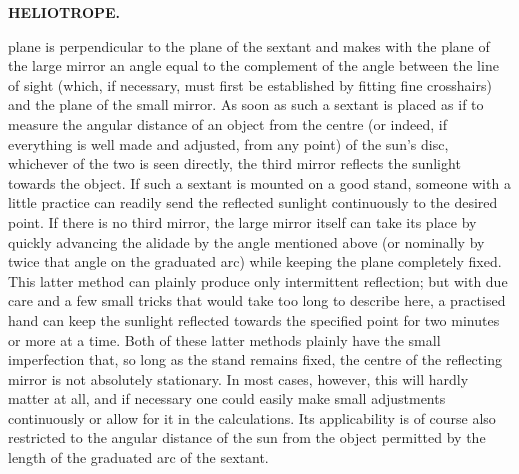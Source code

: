 \par\clearpage
\noindent\null\hfill{\small\textbf{HELIOTROPE.}}\hfill{}\par\medskip
\noindent plane is perpendicular to the plane of the sextant and makes with the plane of the large mirror an angle equal to the complement of the angle between the line of sight (which, if necessary, must first be established by fitting fine crosshairs) and the plane of the small mirror. As soon as such a sextant is placed as if to measure the angular distance of an object from the centre (or indeed, if everything is well made and adjusted, from any point) of the sun's disc, whichever of the two is seen directly, the third mirror reflects the sunlight towards the object. If such a sextant is mounted on a good stand, someone with a little practice can readily send the reflected sunlight continuously to the desired point. If there is no third mirror, the large mirror itself can take its place by quickly advancing the alidade by the angle mentioned above (or nominally by twice that angle on the graduated arc) while keeping the plane completely fixed. This latter method can plainly produce only intermittent reflection; but with due care and a few small tricks that would take too long to describe here, a practised hand can keep the sunlight reflected towards the specified point for two minutes or more at a time. Both of these latter methods plainly have the small imperfection that, so long as the stand remains fixed, the centre of the reflecting mirror is not absolutely stationary. In most cases, however, this will hardly matter at all, and if necessary one could easily make small adjustments continuously or allow for it in the calculations. Its applicability is of course also restricted to the angular distance of the sun from the object permitted by the length of the graduated arc of the sextant.

